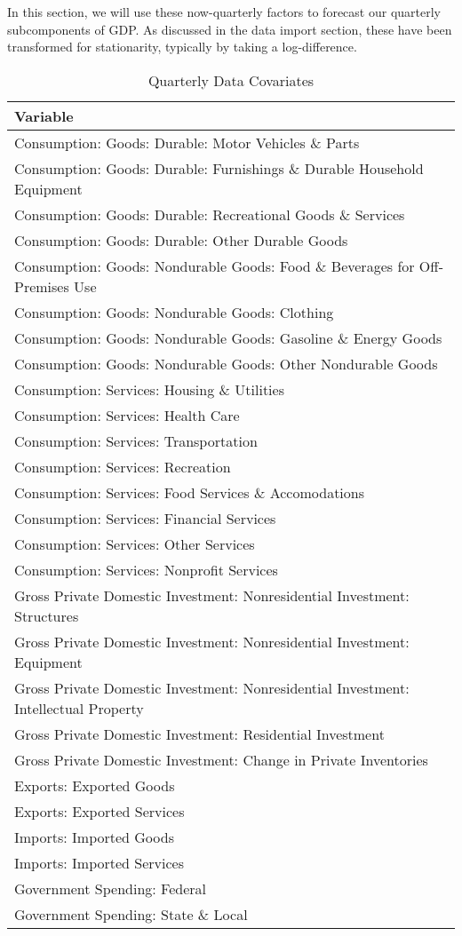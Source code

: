 \documentclass[11pt, letterpaper]{article}\usepackage[]{graphicx}\usepackage[]{color}
\begin{document}
In this section, we will use these now-quarterly factors to forecast our quarterly subcomponents of GDP. As discussed in the data import section, these have been transformed for stationarity, typically by taking a log-difference.
\begin{table}[H]
\centering
\begingroup\scriptsize
\begin{tabular}{l}
  \hline
Variable \\ 
  \hline
Consumption: Goods: Durable: Motor Vehicles \& Parts \\ 
  Consumption: Goods: Durable: Furnishings \& Durable Household Equipment \\ 
  Consumption: Goods: Durable: Recreational Goods \& Services \\ 
  Consumption: Goods: Durable: Other Durable Goods \\ 
  Consumption: Goods: Nondurable Goods: Food \& Beverages for Off-Premises Use \\ 
  Consumption: Goods: Nondurable Goods: Clothing \\ 
  Consumption: Goods: Nondurable Goods: Gasoline \& Energy Goods \\ 
  Consumption: Goods: Nondurable Goods: Other Nondurable Goods \\ 
  Consumption: Services: Housing \& Utilities \\ 
  Consumption: Services: Health Care \\ 
  Consumption: Services: Transportation \\ 
  Consumption: Services: Recreation \\ 
  Consumption: Services: Food Services \& Accomodations \\ 
  Consumption: Services: Financial Services \\ 
  Consumption: Services: Other Services \\ 
  Consumption: Services: Nonprofit Services \\ 
  Gross Private Domestic Investment: Nonresidential Investment: Structures \\ 
  Gross Private Domestic Investment: Nonresidential Investment: Equipment \\ 
  Gross Private Domestic Investment: Nonresidential Investment: Intellectual Property \\ 
  Gross Private Domestic Investment: Residential Investment \\ 
  Gross Private Domestic Investment: Change in Private Inventories \\ 
  Exports: Exported Goods \\ 
  Exports: Exported Services \\ 
  Imports: Imported Goods \\ 
  Imports: Imported Services \\ 
  Government Spending: Federal \\ 
  Government Spending: State \& Local \\ 
   \hline
\end{tabular}
\endgroup
\caption{Quarterly Data Covariates} 
\end{table}
\end{document}
